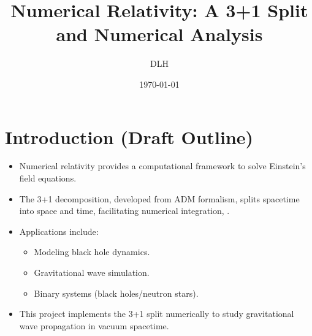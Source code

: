 \documentclass[12pt]{article}
\title{Numerical Relativity: A 3+1 Split and Numerical Analysis}
\author{DLH}
\date{\today}
\begin{document}
\maketitle
\tableofcontents

\section{Introduction (Draft Outline)}
\begin{itemize}
    \item Numerical relativity provides a computational framework to solve Einstein's field equations.
    \item The 3+1 decomposition, developed from ADM formalism, splits spacetime into space and time, facilitating numerical integration, \cite{baumgarte2010numerical}.
    \item Applications include:
    \begin{itemize}
        \item Modeling black hole dynamics.
        \item Gravitational wave simulation.
        \item Binary systems (black holes/neutron stars).
    \end{itemize}
    \item This project implements the 3+1 split numerically to study gravitational wave propagation in vacuum spacetime.
\end{itemize}
\end{document}
